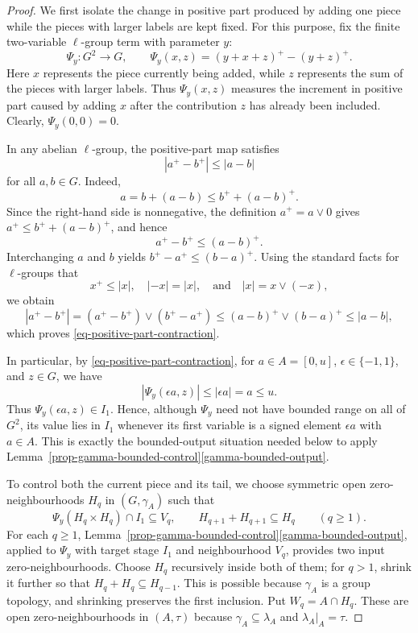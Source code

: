 \documentclass[preprint,3p]{elsarticle}
\theoremstyle{plain}
\theoremstyle{definition}
\numberwithin{equation}{section}
\begin{document}
\begin{proof}
We first isolate the change in positive part produced by adding one piece
while the pieces with larger labels are kept fixed.  For this purpose,
fix the finite two-variable $\ell$-group term with parameter $y$:
\[
 \Psi_y\colon G^2\longrightarrow G,
 \qquad
 \Psi_y(x,z)=(y+x+z)^+-(y+z)^+.
\]
Here $x$ represents the piece currently being added, while $z$ represents
the sum of the pieces with larger labels.  Thus $\Psi_y(x,z)$ measures the
increment in positive part caused by adding $x$ after the contribution
$z$ has already been included.  Clearly, $\Psi_y(0,0)=0$. 

In any abelian $\ell$-group, the positive-part map satisfies
\begin{equation}
\label{eq-positive-part-contraction}
 |a^+-b^+|\leq|a-b|
\end{equation}
for all $a,b\in G$.  Indeed,
\[
 a=b+(a-b)\leq b^++(a-b)^+.
\]
Since the right-hand side is nonnegative, the definition
$a^+=a\vee0$ gives $a^+\leq b^++(a-b)^+$, and hence 
\[
 a^+-b^+\leq(a-b)^+.
\]
Interchanging $a$ and $b$ yields $b^+-a^+\leq(b-a)^+$.
Using the standard facts for $\ell$-groups that
\[
 x^+\leq |x|,
 \quad
 |-x|=|x|,
 \quad\text{and}\quad
 |x|=x\vee(-x),
\]
we obtain
\[
 |a^+-b^+|
 =
 (a^+-b^+)\vee(b^+-a^+)
 \leq(a-b)^+\vee(b-a)^+
 \leq |a-b|,
\]
which proves \eqref{eq-positive-part-contraction}.

In particular, by \eqref{eq-positive-part-contraction}, for
$a\in A=[0,u]$, $\epsilon\in\{-1,1\}$, and $z\in G$, we have
\[
 |\Psi_y(\epsilon a,z)|
 \leq |\epsilon a|
 =a
 \leq u.
\]
Thus $\Psi_y(\epsilon a,z)\in I_1$.
Hence, although $\Psi_y$ need not have bounded range on all of $G^2$, its
value lies in $I_1$ whenever its first variable is a signed element
$\epsilon a$ with $a\in A$.  This is exactly the bounded-output situation
needed below to apply
Lemma~\ref{prop-gamma-bounded-control}\ref{gamma-bounded-output}.

To control both the current piece and its tail, we choose
symmetric open zero-neighbourhoods $H_q$ in $(G,\gamma_A)$ such that
\[
 \Psi_y(H_q\times H_q)\cap I_1\subseteq V_q,
 \qquad H_{q+1}+H_{q+1}\subseteq H_q
 \qquad(q\geq1).
\]
For each $q\geq1$,
Lemma~\ref{prop-gamma-bounded-control}\ref{gamma-bounded-output}, applied
to $\Psi_y$ with target stage $I_1$ and neighbourhood $V_q$,
provides two input zero-neighbourhoods.
Choose $H_q$ recursively inside both of them; for $q>1$,
shrink it further so that $H_q+H_q\subseteq H_{q-1}$.
This is possible because $\gamma_A$ is a group topology, and
shrinking preserves the first inclusion.
Put $W_q=A\cap H_q$.  These are open zero-neighbourhoods in
$(A,\tau)$ because $\gamma_A\subseteq\lambda_A$ and
$\lambda_A|_A=\tau$.


\end{proof}
\end{document}
